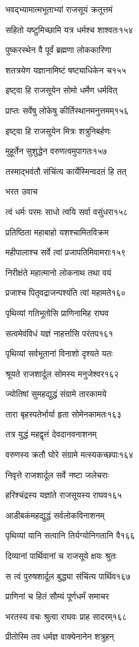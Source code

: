 भवद्भ्यामात्मभूताभ्यां राजसूयं क्रतूत्तमं

सहितो यष्टुमिच्छामि यत्र धर्मश्च शाश्वतः१५४

पुष्करस्थेन वै पूर्वं ब्रह्मणा लोककारिणा

शतत्रयेण यज्ञानामिष्टं षष्ट्याधिकेन च१५५

इष्ट्वा हि राजसूयेन सोमो धर्मेण धर्मवित्

प्राप्तः सर्वेषु लोकेषु कीर्तिस्थानमनुत्तमम्१५६

इष्ट्वा हि राजसूयेन मित्रः शत्रुनिबर्हणः

मुहूर्तेन सुशुद्धेन वरुणत्वमुपागतः१५७

तस्माद्भवंतौ संचिंत्य कार्येस्मिन्वदतं हि तत्

भरत उवाच

त्वं धर्मः परमः साधो त्वयि सर्वा वसुंधरा१५८

प्रतिष्ठिता महाबाहो यशश्चामितविक्रम

महीपालाश्च सर्वे त्वां प्रजापतिमिवामराः१५९

निरीक्षंते महात्मानो लोकनाथ तथा वयं

प्रजाश्च पितृवद्राजन्पश्यंति त्वां महामते१६०

पृथिव्यां गतिभूतोसि प्राणिनामिह राघव

सत्वमेवंविधं यज्ञं नाहर्त्तासि परंतप१६१

पृथिव्यां सर्वभूतानां विनाशो दृश्यते यतः

श्रूयते राजशार्दूल सोमस्य मनुजेश्वर१६२

ज्योतिषां सुमहद्युद्धं संग्रामे तारकामये

तारा बृहस्पतेर्भार्या हृता सोमेनकामतः१६३

तत्र युद्धं महद्वृत्तं देवदानवनाशनम्

वरुणस्य क्रतौ घोरे संग्रामे मत्स्यकच्छपाः१६४

निवृत्ते राजशार्दूल सर्वे नष्टा जलेचराः

हरिश्चंद्रस्य यज्ञांते राजसूयस्य राघव१६५

आडीबकंमहद्युद्धं सर्वलोकविनाशनम्

पृथिव्यां यानि सत्वानि तिर्यग्योनिगतानि वै१६६

दिव्यानां पार्थिवानां च राजसूये क्षयः श्रुतः

स त्वं पुरुषशार्दूल बुद्ध्या संचिंत्य पार्थिव१६७

प्राणिनां च हितं सौम्यं पूर्णधर्मं समाचर

भरतस्य वचः श्रुत्वा राघवः प्राह सादरम्१६८

प्रीतोस्मि तव धर्मज्ञ वाक्येनानेन शत्रुहन्


